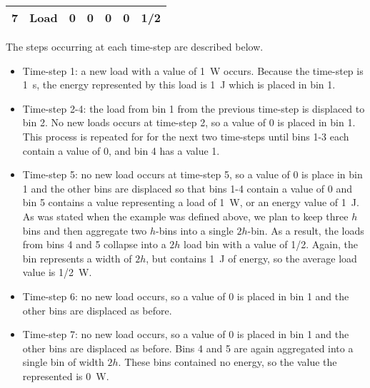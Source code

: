 \documentclass[review,12pt]{elsarticle}
\begin{document}
\begin{table}[htb!]
\begin{tabular}{|ccccccc|}
\multicolumn{1}{|c|}{\multirow{-2}{*}{7}} & \multicolumn{1}{c|}{Load}  & \multicolumn{1}{c|}{0}   & \multicolumn{1}{c|}{0}                        & \multicolumn{1}{c|}{0}                        & \multicolumn{1}{c|}{0}                                               & 1/2                                             \\ \hline
\end{tabular}
\end{table}

The steps occurring at each time-step are described below.

\begin{itemize}
    \item Time-step 1: a new load with a value of \SI{1}{\watt} occurs. Because the time-step is \SI{1}{\second}, the energy represented by this load is \SI{1}{\joule} which is placed in bin 1.

    \item Time-step 2-4: the load from bin 1 from the previous time-step is displaced to bin 2. No new loads occurs at time-step 2, so a value of 0 is placed in bin 1. This process is repeated for for the next two time-steps until bins 1-3 each contain a value of 0, and bin 4 has a value 1.

    \item Time-step 5: no new load occurs at time-step 5, so a value of 0 is place in bin 1 and the other bins are displaced so that bins 1-4 contain a value of 0 and bin 5 contains a value representing a load of \SI{1}{\watt}, or an energy value of \SI{1}{\joule}. As was stated when the example was defined above, we plan to keep three $h$ bins and then aggregate two $h$-bins into a single $2h$-bin. As a result, the loads from bins 4 and 5 collapse into a $2h$ load bin with a value of 1/2. Again, the bin represents a width of $2h$, but contains \SI{1}{\joule} of energy, so the average load value is \SI{1/2}{\watt}.

    \item Time-step 6: no new load occurs, so a value of 0 is placed in bin 1 and the other bins are displaced as before.

    \item Time-step 7: no new load occurs, so a value of 0 is placed in bin 1 and the other bins are displaced as before. Bins 4 and 5 are again aggregated into a single bin of width $2h$. These bins contained no energy, so the value the represented is \SI{0}{\watt}.

\end{itemize}
\end{document}
